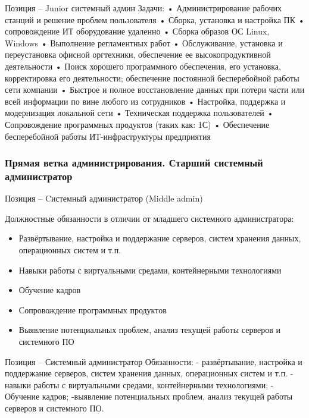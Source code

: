 \documentclass{../industrial-development}
\begin{document}
\lecturenotes
Позиция – Junior системный админ
Задачи:
•	Администрирование рабочих станций и решение проблем пользователя
•	Сборка, установка и настройка ПК
•	сопровождение ИТ оборудование удаленно
•	Сборка образов ОС Linux, Windows
•	Выполнение регламентных работ
•	Обслуживание, установка и переустановка офисной оргтехники, обеспечение ее высокопродуктивной деятельности
•	Поиск хорошего программного обеспечения, его установка, корректировка его деятельности; обеспечение постоянной бесперебойной работы сети компании
•	Быстрое и полное восстановление данных при потери части или всей информации по вине любого из сотрудников
•	Настройка, поддержка и модернизация локальной сети
•	Техническая поддержка пользователей
•	Сопровождение программных продуктов (таких как: 1С)
•	Обеспечение бесперебойной работы ИТ-инфраструктуры предприятия

\begin{frame} \frametitle{Прямая ветка администрирования. Старший системный администратор }
 \begin{block}{}
  \alert{Позиция – Cистемный администратор (Middle admin)}

Должностные обязанности в отличии от младшего системного администратора: 
  \end{block}
  \begin{itemize}
  \item   Развёртывание, настройка и поддержание серверов, систем хранения данных, операционных систем и т.п.
  \item Навыки работы с виртуальными средами, контейнерными технологиями
  \item Обучение кадров
 \item Сопровождение программных продуктов
 \item Выявление потенциальных проблем, анализ текущей работы серверов и системного ПО
  \end{itemize}
\end{frame}

\lecturenotes
Позиция – Системный администратор
Обязанности:
- развёртывание, настройка и поддержание серверов, систем хранения данных, операционных систем и т.п.
- навыки работы с виртуальными средами, контейнерными технологиями;
- Обучение кадров;
-выявление потенциальных проблем, анализ текущей работы серверов и системного ПО.
\end{document}
